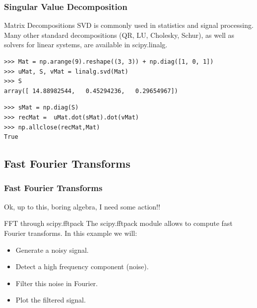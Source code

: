 \documentclass[10pt,colorlinks]{beamer}
\begin{document}
\begin{frame}[fragile]\frametitle{Singular Value Decomposition}
\begin{block}{Matrix Decompositions}
SVD is commonly used in statistics and signal processing. Many other standard decompositions (QR, LU, Cholesky, Schur), as well as solvers for linear systems, are available in scipy.linalg.
\end{block}
\begin{verbatim}
>>> Mat = np.arange(9).reshape((3, 3)) + np.diag([1, 0, 1])
>>> uMat, S, vMat = linalg.svd(Mat)
>>> S
array([ 14.88982544,   0.45294236,   0.29654967])
\end{verbatim}

\pause 
\begin{verbatim}
>>> sMat = np.diag(S)
>>> recMat =  uMat.dot(sMat).dot(vMat)
>>> np.allclose(recMat,Mat)
True
\end{verbatim}

  
\end{frame}
\subsection{Fast Fourier Transforms}
\begin{frame}[fragile]\frametitle{Fast Fourier Transforms}
  \begin{block}{}
  Ok, up to this, boring algebra, I need some action!!
  \end{block}
\pause \begin{block}{FFT through scipy.fftpack}
The scipy.fftpack module allows to compute fast Fourier transforms.
In this example we will:
\begin{itemize}
    \item Generate a noisy signal.
    \item Detect a high frequency component (noise).
    \item Filter this noise in Fourier. 
    \item Plot the filtered signal. 
\end{itemize}
\end{block}
\end{frame}
\end{document}
